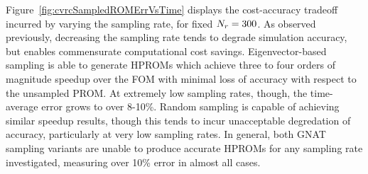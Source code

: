 Figure~\ref{fig:cvrcSampledROMErrVsTime} displays the cost-accuracy tradeoff incurred by varying the sampling rate, for fixed $N_r = 300$. As observed previously, decreasing the sampling rate tends to degrade simulation accuracy, but enables commensurate computational cost savings. Eigenvector-based sampling is able to generate HPROMs which achieve three to four orders of magnitude speedup over the FOM with minimal loss of accuracy with respect to the unsampled PROM. At extremely low sampling rates, though, the time-average error grows to over 8-10\%. Random sampling is capable of achieving similar speedup results, though this tends to incur unacceptable degredation of accuracy, particularly at very low sampling rates. In general, both GNAT sampling variants are unable to produce accurate HPROMs for any sampling rate investigated, measuring over 10\% error in almost all cases.

